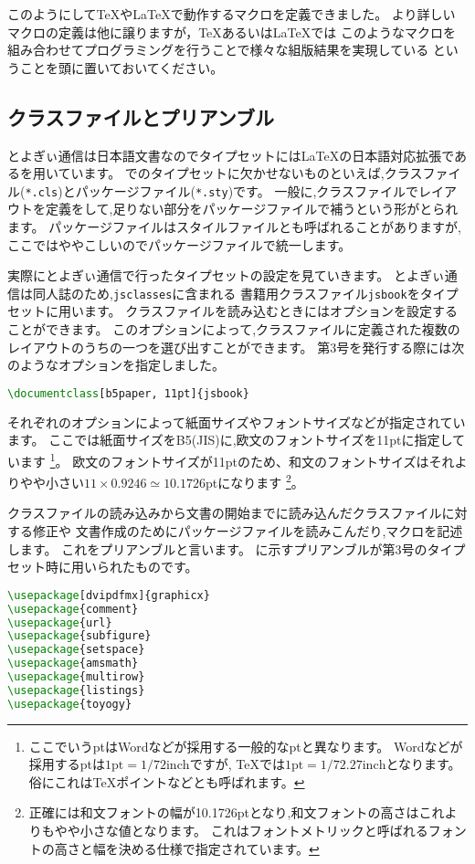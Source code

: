 このようにして{\TeX}や{\LaTeX}で動作するマクロを定義できました。
より詳しいマクロの定義は他に譲りますが，{\TeX}あるいは{\LaTeX}では
このようなマクロを組み合わせてプログラミングを行うことで様々な組版結果を実現している
ということを頭に置いておいてください。

\subsection{クラスファイルとプリアンブル}

とよぎぃ通信は日本語文書なのでタイプセットには{\LaTeX}の日本語対応拡張である{\pLaTeX}を用いています。
{\pLaTeX}でのタイプセットに欠かせないものといえば,クラスファイル(\texttt{*.cls})とパッケージファイル(\texttt{*.sty})です。
一般に,クラスファイルでレイアウトを定義をして,足りない部分をパッケージファイルで補うという形がとられます。
パッケージファイルはスタイルファイルとも呼ばれることがありますが,ここではややこしいのでパッケージファイルで統一します。

実際にとよぎぃ通信で行ったタイプセットの設定を見ていきます。
とよぎぃ通信は同人誌のため,\texttt{jsclasses}に含まれる
書籍用クラスファイル\texttt{jsbook}をタイプセットに用います。
クラスファイルを読み込むときにはオプションを設定することができます。
このオプションによって,クラスファイルに定義された複数のレイアウトのうちの一つを選び出すことができます。
第3号を発行する際には次のようなオプションを指定しました。
\begin{lstlisting}[caption=クラスファイルの指定,label=lis:class,language=tex]
\documentclass[b5paper, 11pt]{jsbook}
\end{lstlisting}
それぞれのオプションによって紙面サイズやフォントサイズなどが指定されています。
ここでは紙面サイズをB5(JIS)に,欧文のフォントサイズを11ptに指定しています
\footnote{ここでいうptはWordなどが採用する一般的なptと異なります。
Wordなどが採用するptは$1\mathrm{pt} = 1 / 72\mathrm{inch}$ですが,
{\TeX}では$1\mathrm{pt} = 1 / 72.27\mathrm{inch}$となります。
俗にこれは{\TeX}ポイントなどとも呼ばれます。}。
欧文のフォントサイズが11ptのため、和文のフォントサイズはそれよりやや小さい$11 \times 0.9246 \simeq 10.1726$ptになります
\footnote{正確には和文フォントの幅が10.1726ptとなり,和文フォントの高さはこれよりもやや小さな値となります。
これはフォントメトリックと呼ばれるフォントの高さと幅を決める仕様で指定されています。}。

クラスファイルの読み込みから文書の開始までに読み込んだクラスファイルに対する修正や
文書作成のためにパッケージファイルを読みこんだり,マクロを記述します。
これをプリアンブルと言います。
に示すプリアンブルが第3号のタイプセット時に用いられたものです。
\begin{lstlisting}[caption=プリアンブル,label=lis:preamble,language=tex]
\usepackage[dvipdfmx]{graphicx}
\usepackage{comment}
\usepackage{url}
\usepackage{subfigure}
\usepackage{setspace}
\usepackage{amsmath}
\usepackage{multirow}
\usepackage{listings}
\usepackage{toyogy}
\end{lstlisting}

